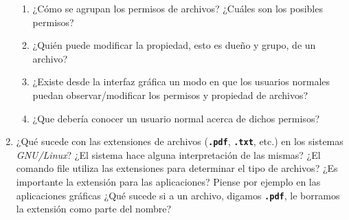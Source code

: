 \documentclass[12pt]{article}
\newcommand{\code}[1]{\textbf{\tt #1}}
\begin{document}
\begin{enumerate}
        \begin{enumerate}

            \item ¿Cómo se agrupan los permisos de archivos? ¿Cuáles son los
                posibles permisos?

            \item ¿Quién puede modificar la propiedad, esto es dueño y grupo,
                de un archivo?

            \item ¿Existe desde la interfaz gráfica un modo en que los
                usuarios normales puedan observar/modificar los permisos y
                propiedad de archivos?

            \item ¿Que debería conocer un usuario normal acerca de dichos
                permisos?

        \end{enumerate}

    \item   ¿Qué sucede con las extensiones de archivos (\code{.pdf},
        \code{.txt}, etc.) en los sistemas \emph{GNU/Linux}? ¿El sistema hace
        alguna interpretación de las mismas? ¿El comando file utiliza las
        extensiones para determinar el tipo de archivos? ¿Es importante la
        extensión para las aplicaciones? Piense por ejemplo en las
        aplicaciones gráficas ¿Qué sucede si a un archivo, digamos
        \code{.pdf}, le borramos la extensión como parte del nombre?

\end{enumerate}
\end{document}
